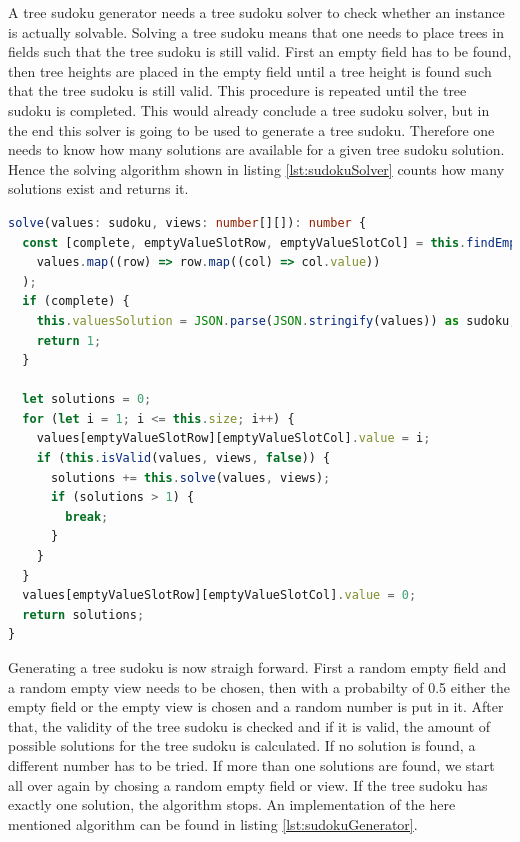 A tree sudoku generator needs a tree sudoku solver to check whether an instance is actually solvable. Solving a tree sudoku means that one needs to place trees in fields such that the tree sudoku is still valid. First an empty field has to be found, then tree heights are placed in the empty field until a tree height is found such that the tree sudoku is still valid. This procedure is repeated until the tree sudoku is completed. This would already conclude a tree sudoku solver, but in the end this solver is going to be used to generate a tree sudoku. Therefore one needs to know how many solutions are available for a given tree sudoku solution. Hence the solving algorithm shown in listing \ref{lst:sudokuSolver} counts how many solutions exist and returns it.

\begin{lstlisting}[language=TypeScript,caption={Solving algorithm for a tree sudoku instance},label={lst:sudokuSolver}]
solve(values: sudoku, views: number[][]): number {
  const [complete, emptyValueSlotRow, emptyValueSlotCol] = this.findEmptySlot(
    values.map((row) => row.map((col) => col.value))
  );
  if (complete) {
    this.valuesSolution = JSON.parse(JSON.stringify(values)) as sudoku; // deep copy
    return 1;
  }

  let solutions = 0;
  for (let i = 1; i <= this.size; i++) {
    values[emptyValueSlotRow][emptyValueSlotCol].value = i;
    if (this.isValid(values, views, false)) {
      solutions += this.solve(values, views);
      if (solutions > 1) {
        break;
      }
    }
  }
  values[emptyValueSlotRow][emptyValueSlotCol].value = 0;
  return solutions;
}
\end{lstlisting}

Generating a tree sudoku is now straigh forward. First a random empty field and a random empty view needs to be chosen, then with a probabilty of 0.5 either the empty field or the empty view is chosen and a random number is put in it. After that, the validity of the tree sudoku is checked and if it is valid, the amount of possible solutions for the tree sudoku is calculated. If no solution is found, a different number has to be tried. If more than one solutions are found, we start all over again by chosing a random empty field or view. If the tree sudoku has exactly one solution, the algorithm stops. An implementation of the here mentioned algorithm can be found in listing \ref{lst:sudokuGenerator}.

